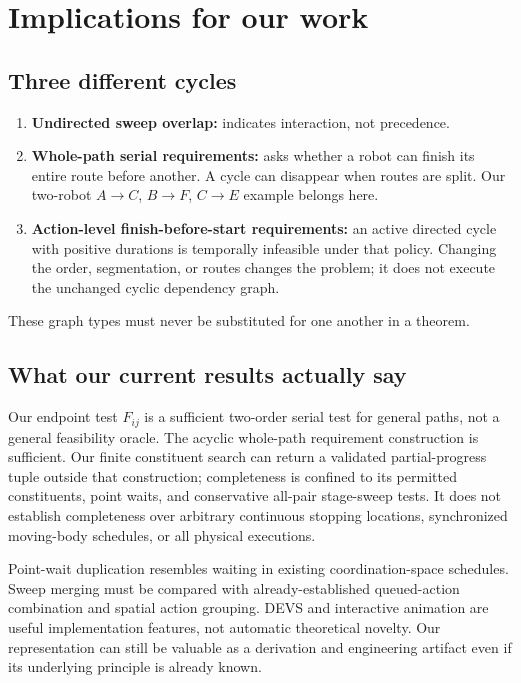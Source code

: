 \documentclass[11pt,a4paper]{article}
\begin{document}
\section{Implications for our work}
\subsection{Three different cycles}
\begin{enumerate}
\item \textbf{Undirected sweep overlap:} indicates interaction, not precedence.
\item \textbf{Whole-path serial requirements:} asks whether a robot can finish its
entire route before another. A cycle can disappear when routes are split.
Our two-robot $A\to C$, $B\to F$, $C\to E$ example belongs here.
\item \textbf{Action-level finish-before-start requirements:} an active directed
cycle with positive durations is temporally infeasible under that policy.
Changing the order, segmentation, or routes changes the problem; it does not
execute the unchanged cyclic dependency graph.
\end{enumerate}
These graph types must never be substituted for one another in a theorem.

\subsection{What our current results actually say}
Our endpoint test $F_{ij}$ is a sufficient two-order serial test for general
paths, not a general feasibility oracle. The acyclic whole-path requirement
construction is sufficient. Our finite constituent search can return a validated
partial-progress tuple outside that construction; completeness is confined to
its permitted constituents, point waits, and conservative all-pair stage-sweep
tests. It does not establish completeness over arbitrary continuous stopping
locations, synchronized moving-body schedules, or all physical executions.

Point-wait duplication resembles waiting in existing coordination-space
schedules. Sweep merging must be compared with already-established queued-action
combination and spatial action grouping. DEVS and interactive animation are useful
implementation features, not automatic theoretical novelty. Our representation
can still be valuable as a derivation and engineering artifact even if its
underlying principle is already known.
\end{document}
